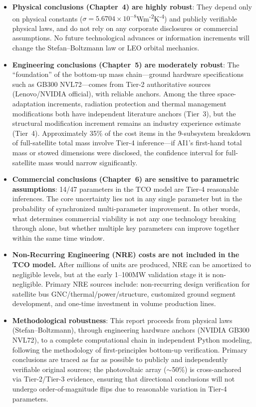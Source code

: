 \begin{itemize}[leftmargin=*]
    \item \textbf{Physical conclusions (Chapter~4) are highly robust}: They depend only on physical constants ($\sigma = 5.6704\times10^{-8}$\;W\;m\textsuperscript{-2}\;K\textsuperscript{-4}) and publicly verifiable physical laws, and do not rely on any corporate disclosures or commercial assumptions. No future technological advances or information increments will change the Stefan--Boltzmann law or LEO orbital mechanics.

    \item \textbf{Engineering conclusions (Chapter~5) are moderately robust}: The ``foundation'' of the bottom-up mass chain---ground hardware specifications such as GB300 NVL72---comes from Tier-2 authoritative sources (Lenovo/NVIDIA official), with reliable anchors. Among the three space-adaptation increments, radiation protection and thermal management modifications both have independent literature anchors (Tier~3), but the structural modification increment remains an industry experience estimate (Tier~4). Approximately 35\% of the cost items in the 9-subsystem breakdown of full-satellite total mass involve Tier-4 inference---if AI1's first-hand total mass or stowed dimensions were disclosed, the confidence interval for full-satellite mass would narrow significantly.

    \item \textbf{Commercial conclusions (Chapter~6) are sensitive to parametric assumptions}: 14/47 parameters in the TCO model are Tier-4 reasonable inferences. The core uncertainty lies not in any single parameter but in the probability of synchronized multi-parameter improvement. In other words, what determines commercial viability is not any one technology breaking through alone, but whether multiple key parameters can improve together within the same time window.

    \item \textbf{Non-Recurring Engineering (NRE) costs are not included in the TCO model.} After millions of units are produced, NRE can be amortized to negligible levels, but at the early 1--100\;MW validation stage it is non-negligible. Primary NRE sources include: non-recurring design verification for satellite bus GNC/thermal/power/structure, customized ground segment development, and one-time investment in volume production lines.

    \item \textbf{Methodological robustness}: This report proceeds from physical laws (Stefan--Boltzmann), through engineering hardware anchors (NVIDIA GB300 NVL72), to a complete computational chain in independent Python modeling, following the methodology of first-principles bottom-up verification. Primary conclusions are traced as far as possible to publicly and independently verifiable original sources; the photovoltaic array ($\sim$50\%) is cross-anchored via Tier-2/Tier-3 evidence, ensuring that directional conclusions will not undergo order-of-magnitude flips due to reasonable variation in Tier-4 parameters.
\end{itemize}

